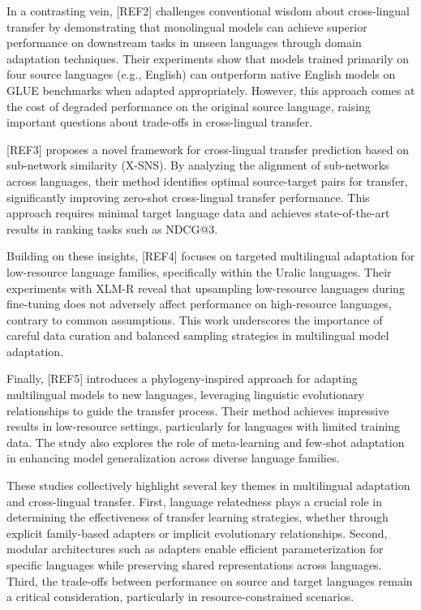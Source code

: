 \documentclass[conference]{IEEEtran}
\begin{document}
In a contrasting vein, [REF2] challenges conventional wisdom about cross-lingual transfer by demonstrating that monolingual models can achieve superior performance on downstream tasks in unseen languages through domain adaptation techniques. Their experiments show that models trained primarily on four source languages (e.g., English) can outperform native English models on GLUE benchmarks when adapted appropriately. However, this approach comes at the cost of degraded performance on the original source language, raising important questions about trade-offs in cross-lingual transfer.

[REF3] proposes a novel framework for cross-lingual transfer prediction based on sub-network similarity (X-SNS). By analyzing the alignment of sub-networks across languages, their method identifies optimal source-target pairs for transfer, significantly improving zero-shot cross-lingual transfer performance. This approach requires minimal target language data and achieves state-of-the-art results in ranking tasks such as NDCG@3.

Building on these insights, [REF4] focuses on targeted multilingual adaptation for low-resource language families, specifically within the Uralic languages. Their experiments with XLM-R reveal that upsampling low-resource languages during fine-tuning does not adversely affect performance on high-resource languages, contrary to common assumptions. This work underscores the importance of careful data curation and balanced sampling strategies in multilingual model adaptation.

Finally, [REF5] introduces a phylogeny-inspired approach for adapting multilingual models to new languages, leveraging linguistic evolutionary relationships to guide the transfer process. Their method achieves impressive results in low-resource settings, particularly for languages with limited training data. The study also explores the role of meta-learning and few-shot adaptation in enhancing model generalization across diverse language families.

These studies collectively highlight several key themes in multilingual adaptation and cross-lingual transfer. First, language relatedness plays a crucial role in determining the effectiveness of transfer learning strategies, whether through explicit family-based adapters or implicit evolutionary relationships. Second, modular architectures such as adapters enable efficient parameterization for specific languages while preserving shared representations across languages. Third, the trade-offs between performance on source and target languages remain a critical consideration, particularly in resource-constrained scenarios.
\end{document}
